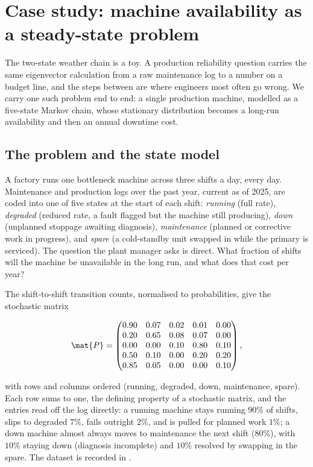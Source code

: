 \section{Case study: machine availability as a steady-state problem}
\label{sec:vol02:ch10:markov-casestudy}

The two-state weather chain is a toy. A production reliability
question carries the same eigenvector calculation from a raw
maintenance log to a number on a budget line, and the steps between
are where engineers most often go wrong. We carry one such problem
end to end: a single production machine, modelled as a five-state
Markov chain, whose stationary distribution becomes a long-run
availability and then an annual downtime cost.

\subsection{The problem and the state model}

A factory runs one bottleneck machine across three shifts a day, every
day. Maintenance and production logs over the past year, current as of
2025, are coded into one of five states at the start of each shift:
\emph{running} (full rate), \emph{degraded} (reduced rate, a fault
flagged but the machine still producing), \emph{down} (unplanned
stoppage awaiting diagnosis), \emph{maintenance} (planned or corrective
work in progress), and \emph{spare} (a cold-standby unit swapped in
while the primary is serviced). The question the plant manager asks is
direct. What fraction of shifts will the machine be unavailable in the
long run, and what does that cost per year?

The shift-to-shift transition counts, normalised to probabilities,
give the stochastic matrix

\[
\mat{P} = \begin{pmatrix}
0.90 & 0.07 & 0.02 & 0.01 & 0.00 \\
0.20 & 0.65 & 0.08 & 0.07 & 0.00 \\
0.00 & 0.00 & 0.10 & 0.80 & 0.10 \\
0.50 & 0.10 & 0.00 & 0.20 & 0.20 \\
0.85 & 0.05 & 0.00 & 0.00 & 0.10
\end{pmatrix},
\]

with rows and columns ordered (running, degraded, down, maintenance,
spare). Each row sums to one, the defining property of a stochastic
matrix, and the entries read off the log directly: a running machine
stays running $90\%$ of shifts, slips to degraded $7\%$, fails outright
$2\%$, and is pulled for planned work $1\%$; a down machine almost
always moves to maintenance the next shift ($80\%$), with $10\%$
staying down (diagnosis incomplete) and $10\%$ resolved by swapping in
the spare. The dataset is recorded in
.

